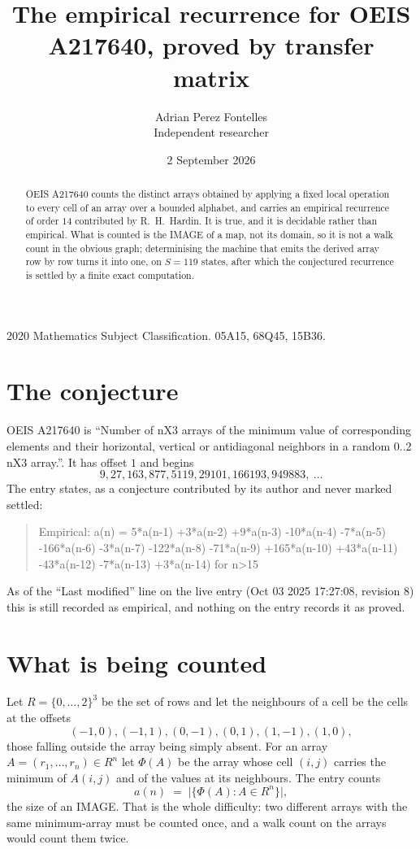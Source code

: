 \documentclass[11pt,a4paper]{article}
\title{The empirical recurrence for OEIS A217640, proved by transfer matrix}
\author{Adrian Perez Fontelles\\ \small Independent researcher}
\date{2 September 2026}
\theoremstyle{plain}
\theoremstyle{definition}
\begin{document}
\maketitle

\begin{abstract}
OEIS A217640 counts the distinct arrays obtained by applying a fixed local operation to every cell
of an array over a bounded alphabet, and carries an empirical recurrence of order $14$
contributed by R.~H.~Hardin. It is true, and it is decidable rather than empirical. What is
counted is the IMAGE of a map, not its domain, so it is not a walk count in the obvious graph;
determinising the machine that emits the derived array row by row turns it into one, on
$S=119$ states, after which the conjectured recurrence is settled by a finite exact
computation.
\end{abstract}

\noindent\small 2020 Mathematics Subject Classification. 05A15, 68Q45, 15B36.\normalsize

\section{The conjecture}

OEIS A217640 is ``Number of nX3 arrays of the minimum value of corresponding elements and their horizontal, vertical or antidiagonal neighbors in a random 0..2 nX3 array.''. It has offset $1$ and begins
\[
9, 27, 163, 877, 5119, 29101, 166193, 949883,\ \dots
\]
The entry states, as a conjecture contributed by its author and never marked settled:
\begin{quote}
Empirical: a(n) = 5*a(n-1) +3*a(n-2) +9*a(n-3) -10*a(n-4) -7*a(n-5) -166*a(n-6) -3*a(n-7) -122*a(n-8) -71*a(n-9) +165*a(n-10) +43*a(n-11) -43*a(n-12) -7*a(n-13) +3*a(n-14) for n>15
\end{quote}
As of the ``Last modified'' line on the live entry (Oct 03 2025 17:27:08, revision 8) this is still
recorded as empirical, and nothing on the entry records it as proved.

\section{What is being counted}

Let $R=\{0,\dots,2\}^{3}$ be the set of rows and let the neighbours of
a cell be the cells at the offsets
\[
(-1,0), (-1,1), (0,-1), (0,1), (1,-1), (1,0),
\]
those falling outside the array being simply absent. For an array
$A=(r_1,\dots,r_n)\in R^n$ let $\Phi(A)$ be the array whose cell $(i,j)$ carries the
minimum of $A(i,j)$ and of the values at its neighbours. The entry counts
\[
a(n)\;=\;\bigl|\{\Phi(A):A\in R^n\}\bigr| ,
\]
the size of an IMAGE. That is the whole difficulty: two different arrays with the same
minimum-array must be counted once, and a walk count on the arrays would count them twice.
\end{document}
